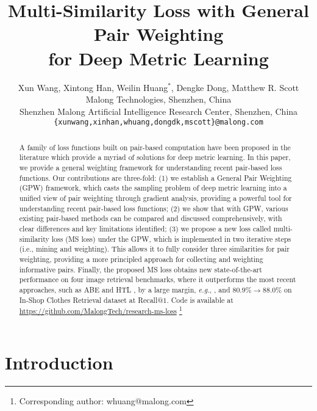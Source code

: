 \documentclass[10pt,twocolumn,letterpaper]{article}
\newcommand\blfootnote[1]{\begingroup
  \renewcommand\thefootnote{}\footnote{#1}\addtocounter{footnote}{-1}\endgroup
}
\begin{document}
	
	
\title{Multi-Similarity Loss with General Pair Weighting \\for Deep Metric Learning}

\author{Xun Wang, Xintong Han, Weilin Huang$^*$, Dengke Dong, Matthew R. Scott\\
Malong Technologies, Shenzhen, China\\
Shenzhen Malong Artificial Intelligence Research Center, Shenzhen, China\\
{\tt\small \{xunwang,xinhan,whuang,dongdk,mscott\}@malong.com}
}

\maketitle
\begin{abstract}	
A family of loss functions built on pair-based computation have been proposed in the literature which provide a myriad of solutions for deep metric learning.
In this paper, we provide a general weighting framework for understanding recent pair-based loss functions. Our contributions are three-fold: (1) we establish a General Pair Weighting (GPW) framework, which casts the sampling problem of deep metric learning into a unified view of pair weighting through gradient analysis, providing a powerful tool for understanding recent pair-based loss functions; (2) we show that with GPW, various existing pair-based methods can be compared and discussed comprehensively, with clear differences and key limitations identified; (3) we propose a new loss called multi-similarity loss (MS loss) under the GPW, which is implemented in two iterative steps (i.e., mining and weighting). This allows it to fully consider three similarities for pair weighting, providing a more principled approach for collecting and weighting informative pairs.
Finally, the proposed MS loss obtains new state-of-the-art performance on four image retrieval benchmarks,
where it outperforms the most recent approaches, such as  ABE\cite{Kim_2018_ECCV} and HTL \cite{HTL}, by a large margin, {\it e.g.}, , and $80.9\% \rightarrow 88.0\%$ on In-Shop Clothes Retrieval dataset at Recall@$1$. Code is available at \url{https://github.com/MalongTech/research-ms-loss}
\blfootnote{Corresponding author: whuang@malong.com}

\end{abstract}

\section{Introduction}
\end{document}
